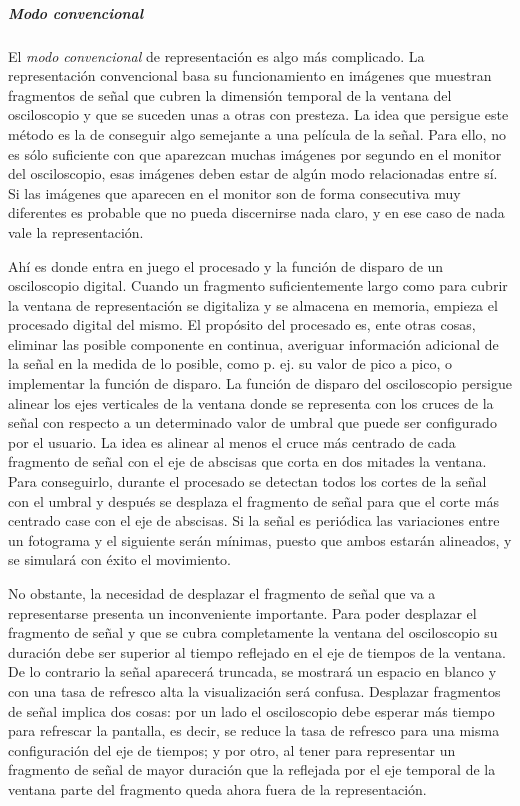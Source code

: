 \subparagraph{Modo convencional}

El \emph{modo convencional} de representación es algo más complicado. La
representación convencional basa su funcionamiento en imágenes que muestran
fragmentos de señal que cubren la dimensión temporal de la ventana del
osciloscopio y que se suceden unas a otras con presteza. La idea que
persigue este método es la de conseguir algo semejante a una película de la
señal. Para ello, no es sólo suficiente con que aparezcan muchas imágenes
por segundo en el monitor del osciloscopio, esas imágenes deben estar de
algún modo relacionadas entre sí. Si las imágenes que aparecen en el
monitor son de forma consecutiva muy diferentes es probable que no pueda
discernirse nada claro, y en ese caso de nada vale la representación.

Ahí es donde entra en juego el procesado y la función de disparo de un
osciloscopio digital. Cuando un fragmento suficientemente largo como para
cubrir la ventana de representación se digitaliza y se almacena en memoria,
empieza el procesado digital del mismo. El propósito del procesado es, ente
otras cosas, eliminar las posible componente en continua, averiguar
información adicional de la señal en la medida de lo posible, como p. ej.
su valor de pico a pico, o implementar la función de disparo. La función de
disparo del osciloscopio persigue alinear los ejes verticales de la ventana
donde se representa con los cruces de la señal con respecto a un
determinado valor de umbral que puede ser configurado por el usuario. La
idea es alinear al menos el cruce más centrado de cada fragmento de señal
con el eje de abscisas que corta en dos mitades la ventana. Para
conseguirlo, durante el procesado se detectan todos los cortes de la señal
con el umbral y después se desplaza el fragmento de señal para que el corte
más centrado case con el eje de abscisas. Si la señal es periódica las
variaciones entre un fotograma y el siguiente serán mínimas, puesto que
ambos estarán alineados, y se simulará con éxito el movimiento.

No obstante, la necesidad de desplazar el fragmento de señal que va a
representarse presenta un inconveniente importante. Para poder desplazar el
fragmento de señal y que se cubra completamente la ventana del osciloscopio
su duración debe ser superior al tiempo reflejado en el eje de tiempos de
la ventana. De lo contrario la señal aparecerá truncada, se mostrará un
espacio en blanco y con una tasa de refresco alta la visualización será
confusa. Desplazar fragmentos de señal implica dos cosas: por un lado el
osciloscopio debe esperar más tiempo para refrescar la pantalla, es decir,
se reduce la tasa de refresco para una misma configuración del eje de
tiempos; y por otro, al tener para representar un fragmento de señal de
mayor duración que la reflejada por el eje temporal de la ventana parte del
fragmento queda ahora fuera de la representación.


